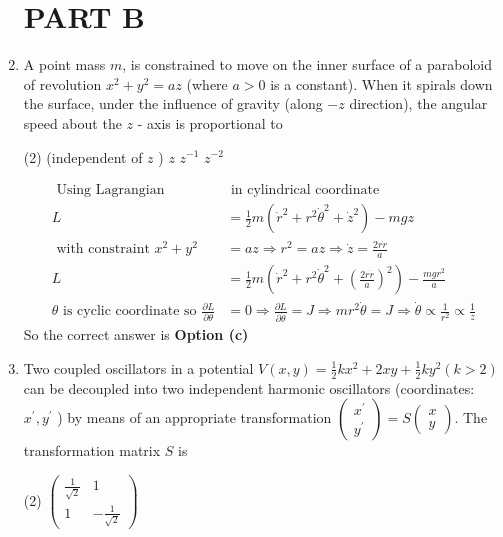 \begin{enumerate}
\section{PART B}	
\item  A point mass $m$, is constrained to move on the inner surface of a paraboloid of revolution $x^{2}+y^{2}=a z$ (where $a>0$ is a constant). When it spirals down the surface, under the influence of gravity (along $-z$ direction), the angular speed about the $z$ - axis is proportional to
 \begin{tasks}(2)
	 (independent of $z$ )
	\task[\textbf{b.}] $z$
	\task[\textbf{c.}]$z^{-1}$
	\task[\textbf{d.}] $z^{-2}$
\end{tasks}
\begin{answer}
	\begin{align*}
	\text { Using Lagrangian}&\text{ in cylindrical coordinate }\\
	L&=\frac{1}{2} m\left(\dot{r}^{2}+r^{2} \dot{\theta}^{2}+\dot{z}^{2}\right)-m g z \quad\\\text{ with constraint } x^{2}+y^{2}&=a z \Rightarrow r^{2}=a z \Rightarrow \dot{z}=\frac{2 r \dot{r}}{a}\\
	 L&=\frac{1}{2} m\left(\dot{r}^{2}+r^{2} \dot{\theta}^{2}+\left(\frac{2 r \dot{r}}{a}\right)^{2}\right)-\frac{m g r^{2}}{a}\\
	\text{$\theta$ is cyclic coordinate so }\frac{\partial L}{\partial \theta}&=0 \Rightarrow \frac{\partial L}{\partial \dot{\theta}}=J \Rightarrow m r^{2} \dot{\theta}=J \Rightarrow \dot{\theta} \propto \frac{1}{r^{2}} \propto \frac{1}{z}
	\end{align*}
	So the correct answer is \textbf{Option (c)}
\end{answer}
\item  Two coupled oscillators in a potential $V(x, y)=\frac{1}{2} k x^{2}+2 x y+\frac{1}{2} k y^{2}(k>2)$ can be decoupled into two independent harmonic oscillators (coordinates: $x^{\prime}, y^{\prime}$ ) by means of an appropriate transformation $\left(\begin{array}{l}x^{\prime} \\ y^{\prime}\end{array}\right)=S\left(\begin{array}{l}x \\ y\end{array}\right)$. The transformation matrix $S$ is
 \begin{tasks}(2)
	\task[\textbf{a.}]$\left(\begin{array}{cc}\frac{1}{\sqrt{2}} & 1 \\ 1 & -\frac{1}{\sqrt{2}}\end{array}\right)$

\end{tasks}
\end{enumerate}

